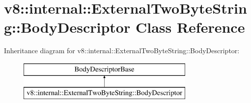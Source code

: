 \hypertarget{classv8_1_1internal_1_1_external_two_byte_string_1_1_body_descriptor}{}\section{v8\+:\+:internal\+:\+:External\+Two\+Byte\+String\+:\+:Body\+Descriptor Class Reference}
\label{classv8_1_1internal_1_1_external_two_byte_string_1_1_body_descriptor}
Inheritance diagram for v8\+:\+:internal\+:\+:External\+Two\+Byte\+String\+:\+:Body\+Descriptor\+:\begin{figure}[H]
\begin{center}
\leavevmode
\includegraphics[height=2.000000cm]{classv8_1_1internal_1_1_external_two_byte_string_1_1_body_descriptor}
\end{center}
\end{figure}
